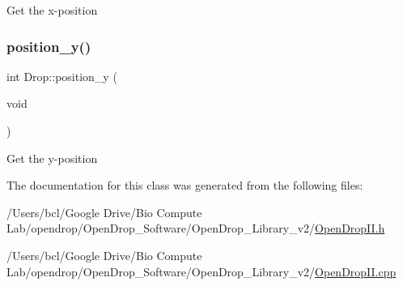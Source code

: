 Get the x-\/position \mbox{\label{class_drop_a7752d271ba81d744a9c503afd9766613}} 
\subsubsection{\texorpdfstring{position\+\_\+y()}{position\_y()}}
{\footnotesize\ttfamily int Drop\+::position\+\_\+y (\begin{DoxyParamCaption}\item[{void}]{ }\end{DoxyParamCaption})}

Get the y-\/position 

The documentation for this class was generated from the following files\+:\begin{DoxyCompactItemize}
\item 
/\+Users/bcl/\+Google Drive/\+Bio Compute Lab/opendrop/\+Open\+Drop\+\_\+\+Software/\+Open\+Drop\+\_\+\+Library\+\_\+v2/\mbox{\hyperlink{_open_drop_i_i_8h}{Open\+Drop\+I\+I.\+h}}\item 
/\+Users/bcl/\+Google Drive/\+Bio Compute Lab/opendrop/\+Open\+Drop\+\_\+\+Software/\+Open\+Drop\+\_\+\+Library\+\_\+v2/\mbox{\hyperlink{_open_drop_i_i_8cpp}{Open\+Drop\+I\+I.\+cpp}}\end{DoxyCompactItemize}
